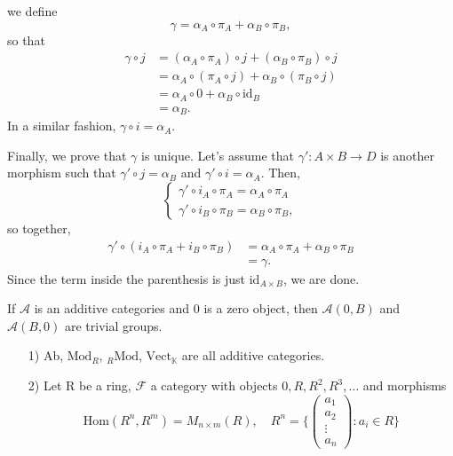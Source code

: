 \documentclass[../category_theory.tex]{subfiles}
\begin{document}
\begin{proof*}
\begin{center}
	\end{center}
	we define
	\[
		\gamma = \alpha_{A}\circ \pi_{A}+\alpha_{B}\circ \pi_{B},
	\]
	so that
	\begin{align*}
		\gamma \circ j & = (\alpha_{A}\circ \pi_{A})\circ j+(\alpha_{B}\circ \pi_{B})\circ j  \\
		               & =\alpha_{A}\circ (\pi _{A}\circ j) +\alpha_{B}\circ (\pi_{B}\circ j) \\
		               & =\alpha_{A}\circ 0 + \alpha_{B}\circ \mathrm{id}_{B}                 \\
		               & =\alpha _{B}.
	\end{align*}
	In a similar fashion, \(\gamma \circ i = \alpha_{A}\).

	Finally, we prove that \(\gamma \) is unique. Let's assume that \(\gamma ':A\times B\rightarrow D\) is another morphism such that \(\gamma'\circ j = \alpha_{B}\) and \(\gamma '\circ i=\alpha_{A}\). Then,
	\[
		\left\{\begin{array}{ll}
			\gamma '\circ i_{A}\circ \pi _{A}=\alpha_{A}\circ \pi _{A} \\
			\gamma '\circ i_{B}\circ \pi _{B}=\alpha _{B}\circ \pi _{B},
		\end{array}\right.
	\]
	so together,
	\begin{align*}
		\gamma '\circ (i_{A}\circ \pi _{A}+i_{B}\circ \pi _{B}) & =\alpha _{A}\circ \pi _{A}+\alpha _{B}\circ \pi_{B} \\
		                                                        & =\gamma.
	\end{align*}
	Since the term inside the parenthesis is just \(\mathrm{id}_{A\times B}\), we are done. \qedsymbol
\end{proof*}
If \(\mathcal{A}\) is an additive categories and 0 is a zero object, then \(\mathcal{A}(0, B)\) and \(\mathcal{A}(B, 0)\) are trivial groups.
\begin{example}
	\begin{itemize}
		\item[1)] Ab, \(\mathrm{Mod}_{R}\), \(_{R}\mathrm{Mod}\), \(\mathrm{Vect}_{\mathbb{K}}\) are all additive categories.
		\item[2)] Let R be a ring, \(\mathcal{F}\) a category with objects \(0, R, R^{2}, R^{3}, \dotsc \) and morphisms
		      \[
			      \mathrm{Hom}(R^{n}, R^{m})=M_{n\times m}(R),\quad R^{n}=\biggl\{\begin{pmatrix}
				      a_{1}  \\
				      a_{2}  \\
				      \vdots \\
				      a_{n}
			      \end{pmatrix}: a_{i}\in R\biggr\}
		      \]
	\end{itemize}
\end{example}
\end{document}
